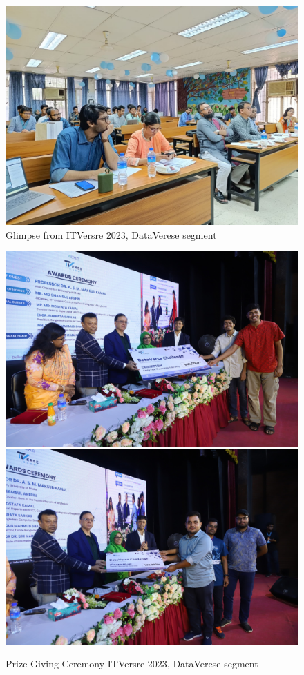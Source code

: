  \begin{figure}[htbp]
    \centering
    \includegraphics[width=\textwidth]{Images/Screenshot/Dataverse_Judghing.jpg}
    \caption{Glimpse from ITVersre 2023, DataVerese segment}
    \label{fig:glimpse}
\end{figure} 

 \begin{figure}[htbp]
    \centering
    \includegraphics[width=\textwidth]{Images/Screenshot/Dataverse_Champ.jpg}
    \includegraphics[width=\textwidth]{Images/Screenshot/Dataverse_runner.jpg}
    \caption{Prize Giving Ceremony ITVersre 2023, DataVerese segment}
    \label{fig:prize_giving}
\end{figure} 
